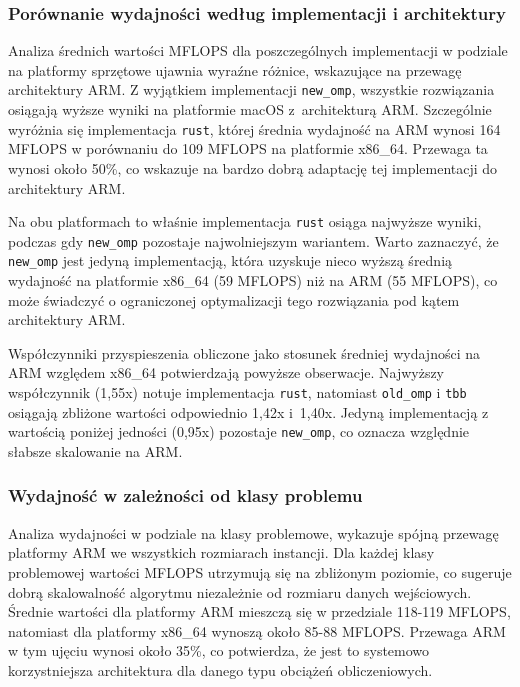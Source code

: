 \subsubsection{Porównanie wydajności według implementacji i architektury}
Analiza średnich wartości MFLOPS dla poszczególnych implementacji w podziale na platformy sprzętowe ujawnia wyraźne różnice, wskazujące na przewagę architektury ARM. Z wyjątkiem implementacji \texttt{new\_omp}, wszystkie rozwiązania osiągają wyższe wyniki na platformie \mbox{macOS} z~architekturą ARM. Szczególnie wyróżnia się implementacja \texttt{rust}, której średnia wydajność na ARM wynosi 164 MFLOPS w porównaniu do 109 MFLOPS na platformie x86\_64. Przewaga ta wynosi około 50\%, co wskazuje na bardzo dobrą adaptację tej implementacji do architektury ARM.

Na obu platformach to właśnie implementacja \texttt{rust} osiąga najwyższe wyniki, podczas gdy \texttt{new\_omp} pozostaje najwolniejszym wariantem. Warto zaznaczyć, że \texttt{new\_omp} jest jedyną implementacją, która uzyskuje nieco wyższą średnią wydajność na platformie x86\_64 (59 MFLOPS) niż na ARM (55 MFLOPS), co może świadczyć o ograniczonej optymalizacji tego rozwiązania pod kątem architektury ARM.

Współczynniki przyspieszenia obliczone jako stosunek średniej wydajności na ARM względem x86\_64 potwierdzają powyższe obserwacje. Najwyższy współczynnik (1,55x) notuje implementacja \texttt{rust}, natomiast \texttt{old\_omp} i \texttt{tbb} osiągają zbliżone wartości odpowiednio 1,42x i~1,40x. Jedyną implementacją z wartością poniżej jedności (0,95x) pozostaje \texttt{new\_omp}, co oznacza względnie słabsze skalowanie na ARM.

\subsubsection{Wydajność w zależności od klasy problemu}
Analiza wydajności w podziale na klasy problemowe, wykazuje spójną przewagę platformy ARM we wszystkich rozmiarach instancji. Dla każdej klasy problemowej wartości MFLOPS utrzymują się na zbliżonym poziomie, co sugeruje dobrą skalowalność algorytmu niezależnie od rozmiaru danych wejściowych. Średnie wartości dla platformy ARM mieszczą się w przedziale 118-119 MFLOPS, natomiast dla platformy x86\_64 wynoszą około 85-88 MFLOPS. Przewaga ARM w tym ujęciu wynosi około 35\%, co potwierdza, że jest to systemowo korzystniejsza architektura dla danego typu obciążeń obliczeniowych.


